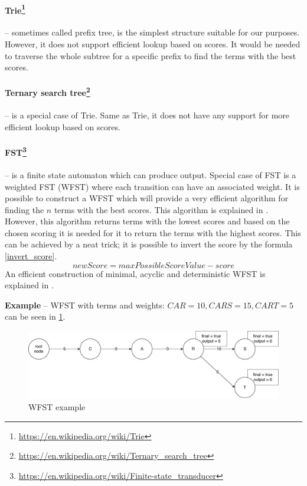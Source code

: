 \paragraph{Trie\protect\footnote{\url{https://en.wikipedia.org/wiki/Trie}}} – sometimes called prefix tree, is the simplest
structure suitable for our purposes. However, it does not support efficient lookup based on scores. It would
be needed to traverse the whole subtree for a specific prefix to find the terms with the best scores.

\paragraph{Ternary search tree\protect\footnote{\url{https://en.wikipedia.org/wiki/Ternary\_search\_tree}}} – is a
special case of Trie. Same as Trie, it does not have any support for more efficient lookup based on scores.

\paragraph{FST\protect\footnote{\url{https://en.wikipedia.org/wiki/Finite-state\_transducer}}} \label{FST} – is a finite state
automaton which can produce output. Special case of FST is a weighted FST (WFST) where each transition can have an
associated weight. It is possible to construct a WFST which will provide a very efficient algorithm for finding the
$n$ terms with the best scores. This algorithm is explained in \citep{Mohri02anefficient}. However, this algorithm returns
terms with the lowest scores and based on the chosen scoring it is needed for it to return the terms with the highest
scores. This can be achieved by a neat trick; it is possible to invert the score by the formula \ref{invert_score}.
\begin{equation}
\label{invert_score}
newScore = maxPossibleScoreValue - score
\end{equation}
An efficient construction of minimal, acyclic and deterministic WFST is explained in \citep{Mihov01directconstruction}.

\textbf{Example} – WFST with terms and weights: $CAR = 10, CARS = 15, CART = 5$ can be seen in \ref{wfst_example}.

\begin{figure}[htbp]
\centering
\includegraphics[width=145mm]{../img/wfst.pdf}
\caption{WFST example}
\label{wfst_example}
\end{figure}

